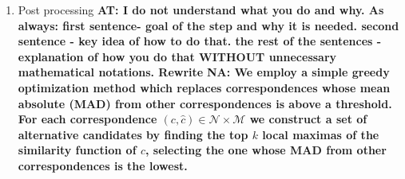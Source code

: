 \documentclass[10pt,twocolumn,letterpaper]{article}
\newcommand{\colornote}[3]{{\color{#1}\bf{#2: #3}\normalfont}}
\newcommand{\colornote}[3]{}
\newcommand {\ayellet}[1]{\colornote{blue}{AT}{#1}}
\newcommand {\nadav}[1]{\colornote{red}{NA}{#1}}
\begin{document}
\begin{enumerate}
\begin{figure}[htb]
    \end{figure}

    \item{Post processing}
    \ayellet{I do not understand what you do and why. As always: first sentence- goal of the step and why it is needed. second sentence - key idea of how to do that. the rest of the sentences - explanation of how you do that WITHOUT unnecessary mathematical notations. Rewrite}
    \nadav{We employ a simple greedy optimization method which replaces correspondences whose mean absolute (MAD) from other correspondences is above a threshold. 
    For each correspondence $(c,\hat{c})\in\mathcal{N}\times\mathcal{M}$ we construct a set of alternative candidates by finding the top $k$ local maximas of the similarity function of $c$, selecting the one whose MAD from other correspondences is the lowest.}
    
\end{enumerate}


\end{document}
